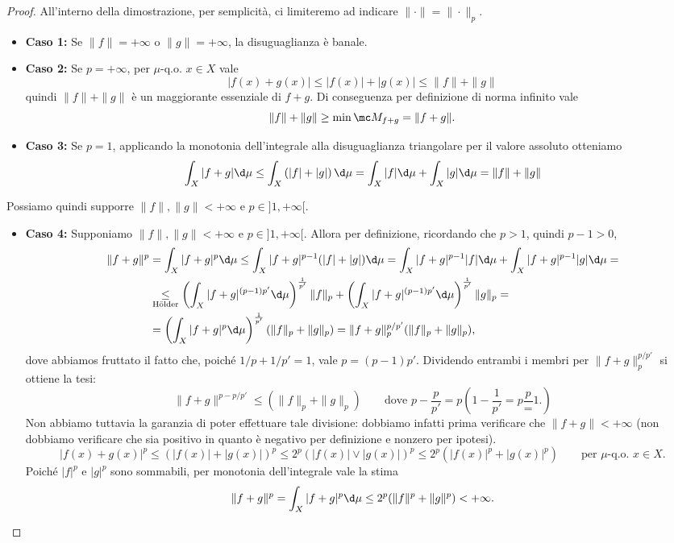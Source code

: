 \begin{proof}
    All'interno della dimostrazione, per semplicità, ci limiteremo ad indicare $\|\cdot\| = \|\cdot \|_p$.
    \begin{itemize}
        \item \textbf{Caso 1:} Se $\|f\| = +\infty$ o $\|g\| = +\infty$, la disuguaglianza è banale.
        \item \textbf{Caso 2:} Se $p = +\infty$, per $\mu$-q.o. $x\in X$ vale 
        \[|f(x)+g(x)|\leq |f(x)|+|g(x)|\leq \|f\|+\|g\|\]
        quindi $\|f\|+\|g\|$ è un maggiorante essenziale di $f+g$. Di conseguenza per definizione di norma infinito vale 
        \[\|f\| +\|g\|\geq \min \mc M_{f+g} = \|f+g\|.\]
        \item \textbf{Caso 3:} Se $p=1$, applicando la monotonia dell'integrale alla disuguaglianza triangolare per il valore assoluto otteniamo 
        \[\int_X|f+g|\d\mu \leq \int_X\left( |f|+|g| \right)\d\mu = \int_X|f|\d\mu+ \int_X|g|\d\mu = \|f\|+\|g\|\]
    \end{itemize}
    Possiamo quindi supporre $\|f\|,\|g\|<+\infty$ e $p\in ]1,+\infty[$.
    \begin{itemize}
        \item \textbf{Caso 4:} Supponiamo $\|f\|,\|g\|<+\infty$ e $p\in ]1,+\infty[$. Allora per definizione, ricordando che $p>1$, quindi $p-1>0$,
        \begin{align*}
            \|f+g\|^p & = \int_X|f+g|^p\d\mu \leq \int_X|f+g|^{p-1}(|f|+|g|)\d \mu = \int_X|f+g|^{p-1}|f|\d \mu + \int_X|f+g|^{p-1}|g|\d \mu = \\
            &\underset{\text{Hölder}} \leq \left( \int_X|f+g|^{(p-1)p'}\d\mu \right)^\frac{1}{p'}\|f\|_p + \left( \int_X|f+g|^{(p-1)p'}\d\mu \right)^\frac{1}{p'}\|g\|_p = \\
            & = \left( \int_X|f+g|^{p}\d\mu \right)^\frac{1}{p'}(\|f\|_p+\|g\|_p) = \|f+g\|_p^{p/p'}(\|f\|_p+\|g\|_p),
        \end{align*}
        dove abbiamos fruttato il fatto che, poiché $1/p+1/p' =1$, vale $p = (p-1)p'$. Dividendo entrambi i membri per $\|f+g\|_p^{p/p'}$ si ottiene la tesi:
        \[\|f+g\|^{p-p/p'} \leq (\|f\|_p+\|g\|_p)\qquad \text{dove }p-\frac{p}{p'} = p\left( 1-\frac{1}{p'}=p\frac{p} = 1. \right)\]
        Non abbiamo tuttavia la garanzia di poter effettuare tale divisione: dobbiamo infatti prima verificare che $\|f+g\|<+\infty$ (non dobbiamo verificare che sia positivo in quanto è negativo per definizione e nonzero per ipotesi).
        \[|f(x)+g(x)|^p\leq \left( |f(x)|+|g(x)| \right)^p\leq 2^p\left(|f(x)|\vee |g(x)|\right)^p\leq 2^p\left(|f(x)|^p+|g(x)|^p\right)\qquad \text{per }\mu\text{-q.o. }x\in X.\]
        Poiché $|f|^p$ e $|g|^p$ sono sommabili, per monotonia dell'integrale vale la stima 
        \[\|f+g\|^p = \int_X|f+g|^p\d \mu \leq 2^p (\|f\|^p + \|g\|^p)<+\infty.\qedhere\]
    \end{itemize}
\end{proof}

